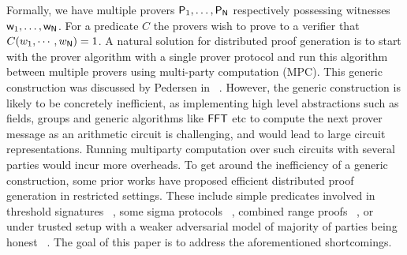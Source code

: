 Formally, we have multiple provers $\mathsf{P}_1, \ldots, \mathsf{P}_{\mathsf{N}}$
respectively possessing witnesses $\mathsf{w}_1, \ldots, \mathsf{w}_{\mathsf{N}}$. For a predicate
$C$ the provers wish to prove to a verifier that $C(w_1,\cdots,w_{\mathsf{N}}) = 1$.  
A natural solution for distributed
proof generation is to start with the prover algorithm with a single prover
protocol and run this algorithm between multiple provers using multi-party
computation (MPC). This generic construction was discussed by Pedersen in
~\cite{Ped92}. However, the generic construction is likely to be concretely
inefficient, as implementing high level abstractions such as fields, groups and
generic algorithms like $\mathsf{FFT}$ etc to compute the next prover message as an
arithmetic circuit is challenging, and would lead to large circuit
representations. Running multiparty computation over such circuits with several
parties would incur more overheads.
To get around the inefficiency of a generic construction, some prior works have
proposed efficient distributed proof generation in restricted settings. These
include simple predicates involved in threshold signatures ~\cite{DDS}, some
sigma protocols ~\cite{EfficientTZ}, combined range proofs ~\cite{bulletproofs},
or under trusted setup with a weaker adversarial model of majority of parties
being honest ~\cite{trinocchio}. The goal of this paper is to address the
aforementioned shortcomings.

